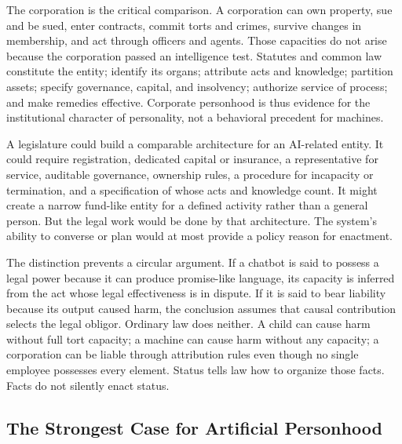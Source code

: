 The corporation is the critical comparison. A corporation can own property, sue and be sued, enter contracts, commit torts and crimes, survive changes in membership, and act through officers and agents. Those capacities do not arise because the corporation passed an intelligence test. Statutes and common law constitute the entity; identify its organs; attribute acts and knowledge; partition assets; specify governance, capital, and insolvency; authorize service of process; and make remedies effective. Corporate personhood is thus evidence for the institutional character of personality, not a behavioral precedent for machines.

A legislature could build a comparable architecture for an AI-related entity. It could require registration, dedicated capital or insurance, a representative for service, auditable governance, ownership rules, a procedure for incapacity or termination, and a specification of whose acts and knowledge count. It might create a narrow fund-like entity for a defined activity rather than a general person. But the legal work would be done by that architecture. The system's ability to converse or plan would at most provide a policy reason for enactment.

The distinction prevents a circular argument. If a chatbot is said to possess a legal power because it can produce promise-like language, its capacity is inferred from the act whose legal effectiveness is in dispute. If it is said to bear liability because its output caused harm, the conclusion assumes that causal contribution selects the legal obligor. Ordinary law does neither. A child can cause harm without full tort capacity; a machine can cause harm without any capacity; a corporation can be liable through attribution rules even though no single employee possesses every element. Status tells law how to organize those facts. Facts do not silently enact status.

\subsection{The Strongest Case for Artificial Personhood}

